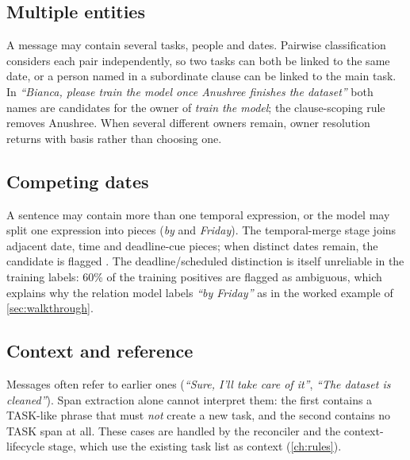 \subsection{Multiple entities}
A message may contain several tasks, people and dates. Pairwise classification considers each pair independently, so two tasks can both be linked to the same date, or a person named in a subordinate clause can be linked to the main task. In \emph{``Bianca, please train the model once Anushree finishes the dataset''} both names are candidates for the owner of \emph{train the model}; the clause-scoping rule removes Anushree. When several different owners remain, owner resolution returns  with basis  rather than choosing one.

\subsection{Competing dates}
A sentence may contain more than one temporal expression, or the model may split one expression into pieces (\emph{by} and \emph{Friday}). The temporal-merge stage joins adjacent date, time and deadline-cue pieces; when distinct dates remain, the candidate is flagged . The deadline/scheduled distinction is itself unreliable in the training labels: 60\% of the  training positives are flagged as ambiguous, which explains why the relation model labels \emph{``by Friday''} as  in the worked example of \cref{sec:walkthrough}.

\subsection{Context and reference}
Messages often refer to earlier ones (\emph{``Sure, I'll take care of it''}, \emph{``The dataset is cleaned''}). Span extraction alone cannot interpret them: the first contains a TASK-like phrase that must \emph{not} create a new task, and the second contains no TASK span at all. These cases are handled by the reconciler and the context-lifecycle stage, which use the existing task list as context (\cref{ch:rules}).
